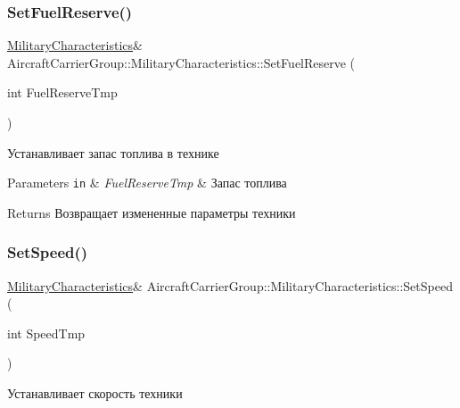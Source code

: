 \subsubsection{\texorpdfstring{Set\+Fuel\+Reserve()}{SetFuelReserve()}}
{\footnotesize\ttfamily \mbox{\hyperlink{class_aircraft_carrier_group_1_1_military_characteristics}{Military\+Characteristics}}\& Aircraft\+Carrier\+Group\+::\+Military\+Characteristics\+::\+Set\+Fuel\+Reserve (\begin{DoxyParamCaption}\item[{int}]{Fuel\+Reserve\+Tmp }\end{DoxyParamCaption})\hspace{0.3cm}{\ttfamily [inline]}}



Устанавливает запас топлива в технике 


\begin{DoxyParams}[1]{Parameters}
\mbox{\tt in}  & {\em Fuel\+Reserve\+Tmp} & Запас топлива \\
\hline
\end{DoxyParams}
\begin{DoxyReturn}{Returns}
Возвращает измененные параметры техники 
\end{DoxyReturn}
\mbox{\label{class_aircraft_carrier_group_1_1_military_characteristics_a185dc7a09586db8136fccc33d6b22681}} 
\subsubsection{\texorpdfstring{Set\+Speed()}{SetSpeed()}}
{\footnotesize\ttfamily \mbox{\hyperlink{class_aircraft_carrier_group_1_1_military_characteristics}{Military\+Characteristics}}\& Aircraft\+Carrier\+Group\+::\+Military\+Characteristics\+::\+Set\+Speed (\begin{DoxyParamCaption}\item[{int}]{Speed\+Tmp }\end{DoxyParamCaption})\hspace{0.3cm}{\ttfamily [inline]}}



Устанавливает скорость техники 



